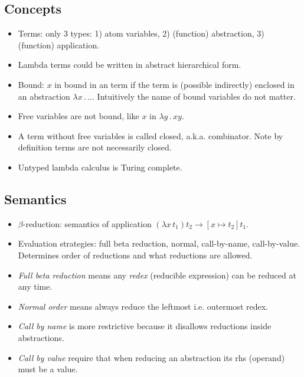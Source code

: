 \documentclass{article}
\begin{document}
\subsection{Concepts}
  \begin{itemize}
    \item Terms: only 3 types: 1) atom variables, 2) (function) abstraction, 3) (function) application.
    \item Lambda terms could be written in abstract hierarchical form.
    \item Bound: $x$ in bound in an term if the term is (possible indirectly) enclosed in an abstraction $\lambda x\, .\, \ldots$
      Intuitively the name of bound variables do not matter.
    \item Free variables are not bound, like $x$ in $\lambda y\, .\, x y$.
    \item A term without free variables is called closed, a.k.a. combinator. Note by definition terms are not necessarily closed.
    \item Untyped lambda calculus is Turing complete.
  \end{itemize}

\subsection{Semantics}
  \begin{itemize}
    \item $\beta$-reduction: semantics of application $(\lambda x\, t_1) t_2 \rightarrow [x\mapsto t_2] t_1$.
    \item Evaluation strategies: full beta reduction, normal, call-by-name, call-by-value.
      Determines order of reductions and what reductions are allowed.
    \item \emph{Full beta reduction} means any \emph{redex} (reducible expression) can be reduced at any time.
    \item \emph{Normal order} means always reduce the leftmost i.e. outermost redex.
    \item \emph{Call by name} is more restrictive because it disallows reductions inside abstractions.
    \item \emph{Call by value} require that when reducing an abstraction its rhs (operand) must be a value.
  \end{itemize}
\end{document}
